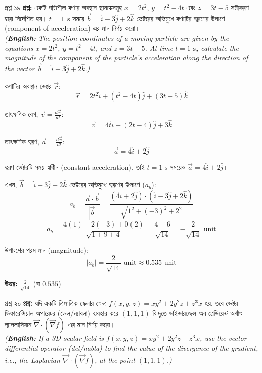 \documentclass[11pt,a4paper]{article}
\begin{document}
\vspace{0.4cm}

\begin{qbox}{প্রশ্ন ১৯}
\textbf{প্রশ্ন:} একটি গতিশীল কণার অবস্থান স্থানাঙ্কসমূহ $x = 2t^2$, $y = t^2 - 4t$ এবং $z = 3t - 5$ সমীকরণ দ্বারা নির্দেশিত হয়। $t = 1\text{ s}$ সময়ে $\vec{b} = \hat{i} - 3\hat{j} + 2\hat{k}$ ভেক্টরের অভিমুখে কণাটির ত্বরণের উপাংশ (component of acceleration) এর মান নির্ণয় করো। \\
\textit{(\textbf{English:} The position coordinates of a moving particle are given by the equations $x = 2t^2$, $y = t^2 - 4t$, and $z = 3t - 5$. At time $t = 1\text{ s}$, calculate the magnitude of the component of the particle's acceleration along the direction of the vector $\vec{b} = \hat{i} - 3\hat{j} + 2\hat{k}$.)}
\end{qbox}

\begin{solbox}
কণাটির অবস্থান ভেক্টর $\vec{r}$:
$$\vec{r} = 2t^2\hat{i} + (t^2 - 4t)\hat{j} + (3t - 5)\hat{k}$$

তাৎক্ষণিক বেগ, $\vec{v} = \frac{d\vec{r}}{dt}$:
$$\vec{v} = 4t\hat{i} + (2t - 4)\hat{j} + 3\hat{k}$$

তাৎক্ষণিক ত্বরণ, $\vec{a} = \frac{d\vec{v}}{dt}$:
$$\vec{a} = 4\hat{i} + 2\hat{j}$$

ত্বরণ ভেক্টরটি সময়-স্বাধীন (constant acceleration), তাই $t = 1\text{ s}$ সময়েও $\vec{a} = 4\hat{i} + 2\hat{j}$।

এখন, $\vec{b} = \hat{i} - 3\hat{j} + 2\hat{k}$ ভেক্টরের অভিমুখে ত্বরণের উপাংশ ($a_b$):
$$a_b = \frac{\vec{a} \cdot \vec{b}}{|\vec{b}|} = \frac{(4\hat{i} + 2\hat{j}) \cdot (\hat{i} - 3\hat{j} + 2\hat{k})}{\sqrt{1^2 + (-3)^2 + 2^2}}$$
$$a_b = \frac{4(1) + 2(-3) + 0(2)}{\sqrt{1 + 9 + 4}} = \frac{4 - 6}{\sqrt{14}} = -\frac{2}{\sqrt{14}}\text{ unit}$$

উপাংশের পরম মান (magnitude):
$$|a_b| = \frac{2}{\sqrt{14}}\text{ unit} \approx 0.535\text{ unit}$$

\textbf{উত্তর:} $\frac{2}{\sqrt{14}}$ (বা $0.535$)
\end{solbox}

\vspace{0.4cm}

\begin{qbox}{প্রশ্ন ২০}
\textbf{প্রশ্ন:} যদি একটি ত্রিমাত্রিক স্কেলার ক্ষেত্র $f(x,y,z) = xy^2 + 2y^2z + z^3x$ হয়, তবে ভেক্টর ডিফারেন্সিয়াল অপারেটর (ডেল/ন্যাবলা) ব্যবহার করে $(1,1,1)$ বিন্দুতে ডাইভারজেন্স অব গ্রেডিয়েন্ট অর্থাৎ ল্যাপলাসিয়ান $\vec{\nabla}\cdot(\vec{\nabla}f)$ এর মান নির্ণয় করো। \\
\textit{(\textbf{English:} If a 3D scalar field is $f(x,y,z) = xy^2 + 2y^2z + z^3x$, use the vector differential operator (del/nabla) to find the value of the divergence of the gradient, i.e., the Laplacian $\vec{\nabla}\cdot(\vec{\nabla}f)$, at the point $(1,1,1)$.)}
\end{qbox}
\end{document}
